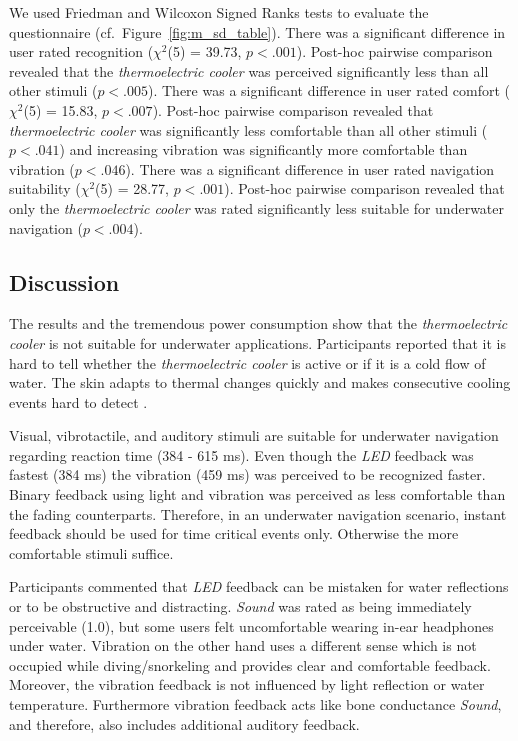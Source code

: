 We used Friedman and Wilcoxon Signed Ranks tests to evaluate the questionnaire (cf.\ Figure~\ref{fig:m_sd_table}).
There was a significant difference in user rated recognition ($\chi^2$(5) = 39.73, $p<.001$).
Post-hoc pairwise comparison revealed that the \emph{thermoelectric cooler} was perceived significantly less than all other stimuli ($p<.005$). \newline
There was a significant difference in user rated comfort ($\chi^2$(5) = 15.83, $p<.007$).
Post-hoc pairwise comparison revealed that \emph{thermoelectric cooler} was significantly less comfortable than all other stimuli ($p<.041$) and increasing vibration was significantly more comfortable than vibration ($p<.046$). \newline
There was a significant difference in user rated navigation suitability ($\chi^2$(5) = 28.77, $p<.001$). 
Post-hoc pairwise comparison revealed that only the \emph{thermoelectric cooler} was rated significantly less suitable for underwater navigation ($p<.004$).

\subsection{Discussion}
The results and the tremendous power consumption show that the \emph{thermoelectric cooler} is not suitable for underwater applications. 
Participants reported that it is hard to tell whether the \emph{thermoelectric cooler} is active or if it is a cold flow of water. 
The skin adapts to thermal changes quickly and makes consecutive cooling events hard to detect \citep{Halvey_thermalFeedback}. 

Visual, vibrotactile, and auditory stimuli are suitable for underwater navigation regarding reaction time (384 - 615 ms). 
Even though the \emph{LED} feedback was fastest (384 ms) the vibration (459 ms) was perceived to be recognized faster. 
Binary feedback using light and vibration was perceived as less comfortable than the fading counterparts. 
Therefore, in an underwater navigation scenario, instant feedback should be used for time critical events only. 
Otherwise the more comfortable stimuli suffice. 

Participants commented that \emph{LED} feedback can be mistaken for water reflections or to be obstructive and distracting. 
\emph{Sound} was rated as being immediately perceivable (1.0), but some users felt uncomfortable wearing in-ear headphones under water. 
Vibration on the other hand uses a different sense which is not occupied while diving/snorkeling and provides clear and comfortable feedback.
Moreover, the vibration feedback is not influenced by light reflection or water temperature.
Furthermore vibration feedback acts like bone conductance \emph{Sound}, and therefore, also includes additional auditory feedback.

